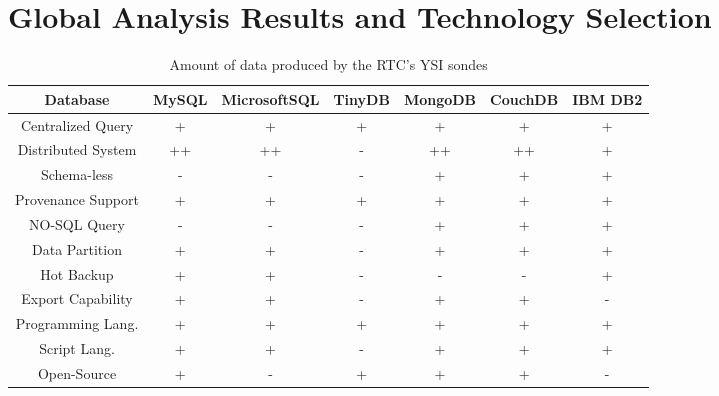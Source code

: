 \section{Global Analysis Results and Technology Selection}

\begin{table}
    \label{tab:ysi-data-distribution}
    \caption{Amount of data produced by the RTC's YSI sondes}
        \begin{center}
        \begin{tabular}{|c|c|c|c|c|c|c|}\hline 
        \textbf{Database} & \textbf{MySQL} & \textbf{MicrosoftSQL} & \textbf{TinyDB} &
        \textbf{MongoDB} & \textbf{CouchDB} & \textbf{IBM DB2}\\\hline 
        Centralized Query & + & + & + & + & + & + \\\hline 
        Distributed System & ++ & ++ & - & ++ & ++ & +\\\hline 
        Schema-less & - & - & - & + & + & +\\\hline 
        Provenance Support & + & + & + & + & + & +\\\hline 
        NO-SQL Query & - & - & - & + & + & +\\\hline 
        Data Partition & + & + & - & + & + & +\\\hline 
        Hot Backup & + & + & - & - & - & +\\\hline 
        Export Capability & + & + & - & + & + & -\\\hline 
        Programming Lang. & + & + & + & + & + & +\\\hline
        Script Lang. & + & + & - & + & + & +\\\hline
        Open-Source & + & - & + & + & + & -\\\hline
        \end{tabular}
        \end{center}
\end{table}
